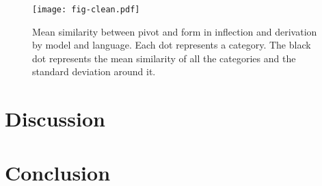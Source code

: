 \documentclass[12pt]{article}
\begin{document}
\begin{figure}[H]
\centering
\texttt{[image: fig-clean.pdf]}
\caption{Mean similarity between pivot and form in inflection and derivation by model and language. Each dot represents a category. The black dot represents the mean similarity of all the categories and the standard deviation around it.}
\label{fig:clean-data}
\end{figure}

\section{Discussion}

\section{Conclusion}

\newpage
{}
\sloppy
\printbibliography
\end{document}
